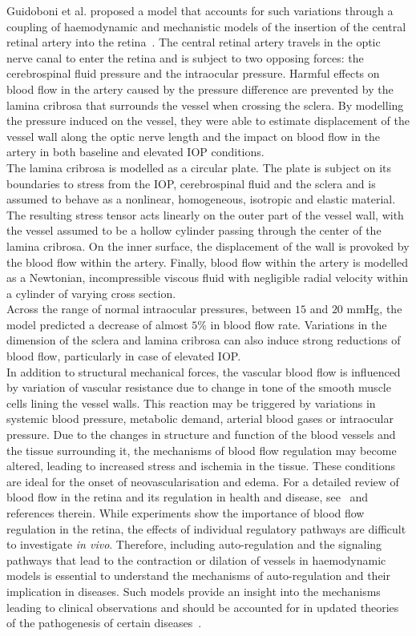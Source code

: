\documentclass[12pt,a4paper]{journal}
\begin{document}
Guidoboni et al. proposed a model that accounts for such variations through a coupling of haemodynamic and mechanistic models of the insertion of the central retinal artery into the retina~\cite{Guidoboni_2014}.
The central retinal artery travels in the optic nerve canal to enter the retina and is subject to two opposing forces: the cerebrospinal fluid pressure and the intraocular pressure.
Harmful effects on blood flow in the artery caused by the pressure difference are prevented by the lamina cribrosa that surrounds the vessel when crossing the sclera.
By modelling the pressure induced on the vessel, they were able to estimate displacement of the vessel wall along the optic nerve length and the impact on blood flow in the artery in both baseline and elevated IOP conditions.\\
The lamina cribrosa is modelled as a circular plate.
The plate is subject on its boundaries to stress from the IOP, cerebrospinal fluid and the sclera and is assumed to behave as a nonlinear, homogeneous, isotropic and elastic material.
The resulting stress tensor acts linearly on the outer part of the vessel wall, with the vessel assumed to be a hollow cylinder passing through the center of the lamina cribrosa.
On the inner surface, the displacement of the wall is provoked by the blood flow within the artery.
Finally, blood flow within the artery is modelled as a Newtonian, incompressible viscous fluid with negligible radial velocity within a cylinder of varying cross section.\\
Across the range of normal intraocular pressures, between $15$ and $20$ mmHg, the model predicted a decrease of almost $5\%$ in blood flow rate.
Variations in the dimension of the sclera and lamina cribrosa can also induce strong reductions of blood flow, particularly in case of elevated IOP. \\

In addition to structural mechanical forces, the vascular blood flow is influenced by variation of vascular resistance due to change in tone of the smooth muscle cells lining the vessel walls.
This reaction may be triggered by variations in systemic blood pressure, metabolic demand, arterial blood gases or intraocular pressure.
Due to the changes in structure and function of the blood vessels and the tissue surrounding it, the mechanisms of blood flow regulation may become altered, leading to increased stress and ischemia in the tissue.
These conditions are ideal for the onset of neovascularisation and edema.
For a detailed review of blood flow in the retina and its regulation in health and disease, see~\cite{Pournaras_2008} and references therein.
While experiments show the importance of blood flow regulation in the retina, the effects of individual regulatory pathways are difficult to investigate \textit{in vivo}. 
Therefore, including auto-regulation and the signaling pathways that lead to the contraction or dilation of vessels in haemodynamic models is essential to understand the mechanisms of auto-regulation and their implication in diseases.
Such models provide an insight into the mechanisms leading to clinical observations and should be accounted for in updated theories of the pathogenesis of certain diseases~\cite{Petersen_2019, Wang_2014}.
\end{document}
